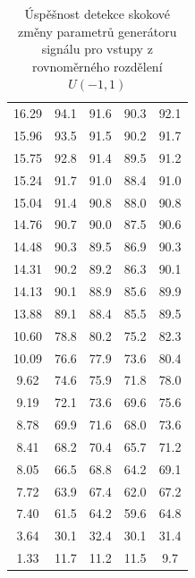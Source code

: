 \documentclass[11pt,twoside,openright]{report}
\begin{document}
\begin{appendices}
\begin{table}[h]
\begin{center}
\begin{tabular}{|c|c|c|c|c|}
16.29 & 94.1 & 91.6 & 90.3 & 92.1 \\ 
15.96 & 93.5 & 91.5 & 90.2 & 91.7 \\ 
15.75 & 92.8 & 91.4 & 89.5 & 91.2 \\ 
15.24 & 91.7 & 91.0 & 88.4 & 91.0 \\ 
15.04 & 91.4 & 90.8 & 88.0 & 90.8 \\ 
14.76 & 90.7 & 90.0 & 87.5 & 90.6 \\ 
14.48 & 90.3 & 89.5 & 86.9 & 90.3 \\ 
14.31 & 90.2 & 89.2 & 86.3 & 90.1 \\ 
14.13 & 90.1 & 88.9 & 85.6 & 89.9 \\ 
13.88 & 89.1 & 88.4 & 85.5 & 89.5 \\ 
10.60 & 78.8 & 80.2 & 75.2 & 82.3 \\ 
10.09 & 76.6 & 77.9 & 73.6 & 80.4 \\ 
9.62 & 74.6 & 75.9 & 71.8 & 78.0 \\ 
9.19 & 72.1 & 73.6 & 69.6 & 75.6 \\ 
8.78 & 69.9 & 71.6 & 68.0 & 73.6 \\ 
8.41 & 68.2 & 70.4 & 65.7 & 71.2 \\ 
8.05 & 66.5 & 68.8 & 64.2 & 69.1 \\ 
7.72 & 63.9 & 67.4 & 62.0 & 67.2 \\ 
7.40 & 61.5 & 64.2 & 59.6 & 64.8 \\ 
3.64 & 30.1 & 32.4 & 30.1 & 31.4 \\ 
1.33 & 11.7 & 11.2 & 11.5 & 9.7 \\ 
\hline
\end{tabular}
\caption{Úspěšnost detekce skokové změny parametrů generátoru signálu pro vstupy z rovnoměrného rozdělení $U(-1,1)$}
\label{tab:uniform}
\end{center}
\end{table}



\end{appendices}
\end{document}
